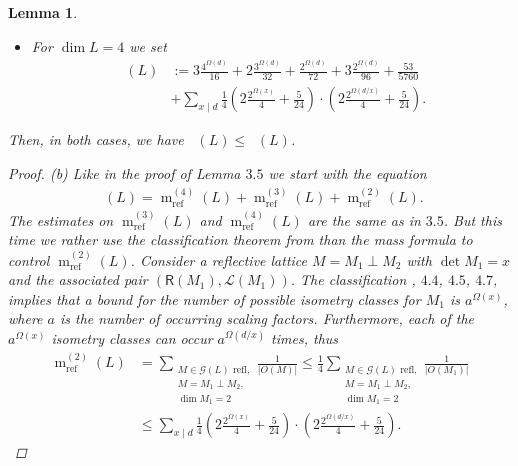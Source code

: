 \documentclass{amsart}
\newtheorem{lem}[thm]{Lemma}
\theoremstyle{definition}
\theoremstyle{remark}
\def\CG{{\mathcal G}}
\def\CG{{\mathcal G}}
\def\CL{{\mathcal L}}
\newcommand{\sR}{\mathsf R}
\DeclareMathOperator{\m}{m}
\DeclareMathOperator{\mref}{m_{ref}}
\DeclareMathOperator{\M}{M}
\DeclareMathOperator{\Nref}{N_{ref}}
\begin{document}
\begin{lem}
\begin{itemize}
  \item[b)] For $\dim L = 4$ we set
    \begin{align*}
     \Nref(L) &:=3\frac{4^{\Omega(d)}}{16} + 2\frac{3^{\Omega(d)}}{32} + \frac{2^{\Omega(d)}}{72} + 3\frac{2^{\Omega(d)}}{96} + \frac{53}{5760} \\
                         &+ \sum_{x \mid d} \frac{1}{4} \left( 2\frac{2^{\Omega(x)}}{4} + \frac{5}{24} \right)\cdot \left( 2\frac{2^{\Omega(d/x)}}{4} + \frac{5}{24} \right).
    \end{align*}
 \end{itemize}
 Then, in both cases, we have $\mref(L) \leq \Nref(L)$.
 \begin{proof}
  (b) Like in the proof of Lemma $3.5$ we start with the equation
  \begin{align*}
     \mref(L) = \m^{(4)}_{\mathrm{ref}}(L) + \m^{(3)}_{\mathrm{ref}}(L) + \m^{(2)}_{\mathrm{ref}}(L).
  \end{align*}
  The estimates on $\m^{(3)}_{\mathrm{ref}}(L)$ and $\m^{(4)}_{\mathrm{ref}}(L)$ are the same as in $3.5$. But this time we rather use the classification theorem from \cite{bs96} than the mass formula
   to control $\m^{(2)}_{\mathrm{ref}}(L)$. Consider a reflective lattice $M = M_1 \perp M_2$ with $\det M_1 =x$ and the associated pair $(\sR(M_1),\CL(M_1))$.
   The classification \cite{bs96}, $4.4$, $4.5$, $4.7$, implies that a bound for the number of possible isometry classes for $M_1$ is $a^{\Omega(x)}$, 
   where $a$ is the number of occurring scaling factors. Furthermore, each of the $a^{\Omega(x)}$ isometry classes can occur $a^{\Omega(d/x)}$ times, thus
   \begin{align*}
    \m^{(2)}_{\mathrm{ref}}(L) & = \sum_{\substack{\text{$M \in \CG(L)$ refl,} \\M = M_1 \perp M_2,\\ \dim M_1=2}} \frac{1}{|O(M)|} 
                               \leq \frac{1}{4} \sum_{\substack{\text{$M \in \CG(L)$ refl,} \\M = M_1 \perp M_2,\\ \dim M_1=2}} \frac{1}{|O(M_1)|} \\                       
                               & \leq \sum_{x \mid d} \frac{1}{4} \left( 2\frac{2^{\Omega(x)}}{4} + \frac{5}{24} \right)\cdot \left( 2\frac{2^{\Omega(d/x)}}{4} + \frac{5}{24} \right).
   \end{align*}


\end{proof}
\end{lem}
\end{document}
